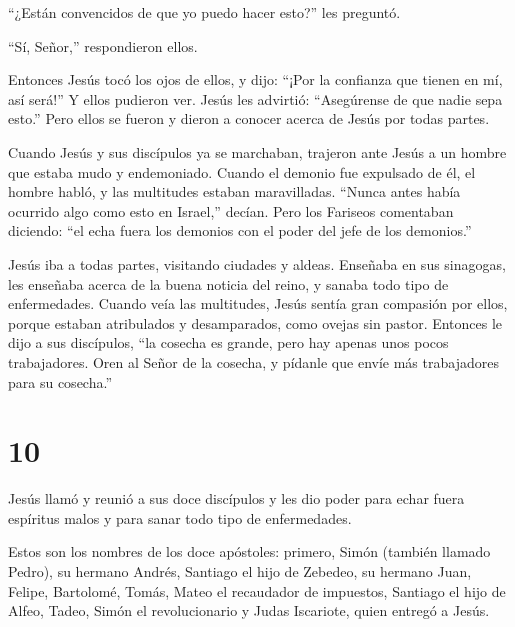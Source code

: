 ``¿Están convencidos de que yo puedo hacer esto?'' les preguntó.

``Sí, Señor,'' respondieron ellos.

 Entonces Jesús tocó los ojos de ellos, y dijo: ``¡Por la
confianza que tienen en mí, así será!''  Y ellos pudieron
ver. Jesús les advirtió: ``Asegúrense de que nadie sepa esto.''
 Pero ellos se fueron y dieron a conocer acerca de Jesús
por todas partes.

 Cuando Jesús y sus discípulos ya se marchaban, trajeron
ante Jesús a un hombre que estaba mudo y endemoniado. 
Cuando el demonio fue expulsado de él, el hombre habló, y las multitudes
estaban maravilladas. ``Nunca antes había ocurrido algo como esto en
Israel,'' decían.  Pero los Fariseos comentaban diciendo:
``el echa fuera los demonios con el poder del jefe de los demonios.''

 Jesús iba a todas partes, visitando ciudades y aldeas.
Enseñaba en sus sinagogas, les enseñaba acerca de la buena noticia del
reino, y sanaba todo tipo de enfermedades.  Cuando veía las
multitudes, Jesús sentía gran compasión por ellos, porque estaban
atribulados y desamparados, como ovejas sin pastor. 
Entonces le dijo a sus discípulos, ``la cosecha es grande, pero hay
apenas unos pocos trabajadores.  Oren al Señor de la
cosecha, y pídanle que envíe más trabajadores para su cosecha.''

\hypertarget{section-9}{%
\section{10}\label{section-9}}

 Jesús llamó y reunió a sus doce discípulos y les dio poder
para echar fuera espíritus malos y para sanar todo tipo de enfermedades.

 Estos son los nombres de los doce apóstoles: primero, Simón
(también llamado Pedro), su hermano Andrés, Santiago el hijo de Zebedeo,
su hermano Juan,  Felipe, Bartolomé, Tomás, Mateo el
recaudador de impuestos, Santiago el hijo de Alfeo, Tadeo, 
Simón el revolucionario y Judas Iscariote, quien entregó a Jesús.

